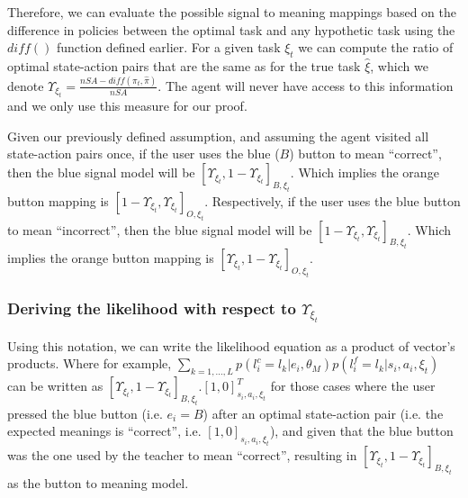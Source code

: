 
Therefore, we can evaluate the possible signal to meaning mappings based on the difference in policies between the optimal task and any hypothetic task using the $diff()$ function defined earlier. For a given task $\xi_t$ we can compute the ratio of optimal state-action pairs that are the same as for the true task $\hat{\xi}$, which we denote $\Upsilon_{\xi_t} = \frac{nSA - diff(\pi_t, \hat{\pi})}{nSA}$. The agent will never have access to this information and we only use this measure for our proof.

Given our previously defined assumption, and assuming the agent visited all state-action pairs once, if the user uses the blue ($B$) button to mean ``correct'', then the blue signal model will be $[\Upsilon_{\xi_t},1-\Upsilon_{\xi_t}]_{B,\xi_t}$. Which implies the orange button mapping is $[1-\Upsilon_{\xi_t},\Upsilon_{\xi_t}]_{O,\xi_t}$. Respectively, if the user uses the blue button to mean ``incorrect'', then the blue signal model will be $[1-\Upsilon_{\xi_t},\Upsilon_{\xi_t}]_{B,\xi_t}$. Which implies the orange button mapping is $[\Upsilon_{\xi_t},1-\Upsilon_{\xi_t}]_{O,\xi_t}$.

\subsubsection*{Deriving the likelihood with respect to $\Upsilon_{\xi_t}$}

Using this notation, we can write the likelihood equation as a product of vector's products. Where for example, $\sum_{k = 1, \ldots, L} p(l^c_i = l_k | e_i, \theta_M) p(l^f_i = l_k | s_i, a_i, \xi_t)$ can be written as $[\Upsilon_{\xi_t},1-\Upsilon_{\xi_t}]_{B,\xi_t}.[1,0]_{s_i,a_i,\xi_t}^T$ for those cases where the user pressed the blue button (i.e. $e_i = B$) after an optimal state-action pair (i.e. the expected meanings is ``correct'', i.e. $[1,0]_{s_i,a_i,\xi_t}$), and given that the blue button was the one used by the teacher to mean ``correct'', resulting in $[\Upsilon_{\xi_t},1-\Upsilon_{\xi_t}]_{B,\xi_t}$ as the button to meaning model.

